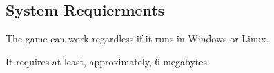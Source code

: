 \subsection{System Requierments}

\indent 

The game can work regardless if it runs in Windows or Linux. 

It requires at least, approximately, 6 megabytes. 